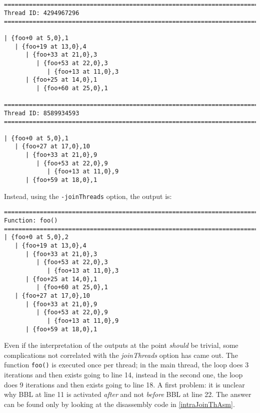 \documentclass[a4paper,10pt]{report}
\begin{document}
\begin{lstlisting}[label=out11, caption={the output of IHPP analyzing \texttt{prog5}}]


=============================================================================
Thread ID: 4294967296
=============================================================================

| {foo+0 at 5,0},1
   | {foo+19 at 13,0},4
      | {foo+33 at 21,0},3
         | {foo+53 at 22,0},3
            | {foo+13 at 11,0},3
      | {foo+25 at 14,0},1
         | {foo+60 at 25,0},1

=============================================================================
Thread ID: 8589934593
=============================================================================

| {foo+0 at 5,0},1
   | {foo+27 at 17,0},10
      | {foo+33 at 21,0},9
         | {foo+53 at 22,0},9
            | {foo+13 at 11,0},9
      | {foo+59 at 18,0},1

\end{lstlisting}

\noindent
Instead, using the \verb|-joinThreads| option, the output is:

\begin{lstlisting}[label=out12,
caption={the output of IHPP analyzing \texttt{prog5} with \texttt{-joinThreads}}]
=============================================================================
Function: foo()
=============================================================================
| {foo+0 at 5,0},2
   | {foo+19 at 13,0},4
      | {foo+33 at 21,0},3
         | {foo+53 at 22,0},3
            | {foo+13 at 11,0},3
      | {foo+25 at 14,0},1
         | {foo+60 at 25,0},1
   | {foo+27 at 17,0},10
      | {foo+33 at 21,0},9
         | {foo+53 at 22,0},9
            | {foo+13 at 11,0},9
      | {foo+59 at 18,0},1

\end{lstlisting}

\noindent
Even if the interpretation of the outputs at the point \emph{should} be trivial,
some complications not correlated with the \emph{joinThreads} option
has came out.
The function \verb|foo()| is executed once per thread; in the main thread, the loop does 3 iterations and then exists going to line 14, instead
in the second one, the loop does 9 iterations and then exists going to line 18.
A first problem: it is unclear why BBL at line 11 is activated \emph{after}
and not \emph{before} BBL at line 22. The answer can be found only by looking at
the disassembly code in \cref{intraJoinThAsm}.
\end{document}
